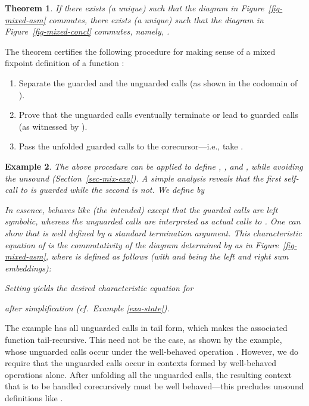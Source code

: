 \documentclass[preprint,draft]
{sigplanconf}
\newtheorem{theorem}{Theorem}
\newtheorem{eexample}[theorem]{Example}
\newcommand{\<}{\langle}
\renewcommand{\>}{\rangle}
\def\S{Section~}
\begin{document}
\begin{theorem}\rm \label{thm-mixed}
If there exists (a unique)  such that the diagram in Figure~\ref{fig-mixed-asm} commutes,
there exists (a unique)  such that the diagram in Figure~\ref{fig-mixed-concl} commutes, namely,
.
\end{theorem}

The theorem certifies the following procedure for making sense of a mixed fixpoint definition of a function :
\begin{enumerate}
\item Separate the guarded and the unguarded calls (as shown in the codomain  of ).
\item Prove that the unguarded calls eventually terminate or lead to guarded calls (as witnessed by ).
\item Pass the unfolded guarded calls to the corecursor---i.e., take .
\end{enumerate}


\begin{eexample}\rm \label{exa-mixed}
The above procedure can be applied to define ,
, and ,
while avoiding the unsound  (\S\ref{sec-mix-exa}).
A simple analysis reveals that
the first self-call to  is guarded while the second is not.
We define
 by
\begin{quote}

\end{quote}
In essence,  behaves like (the intended)  except that the guarded calls are left
symbolic, whereas the unguarded calls are interpreted as actual calls to .
One can show that  is well defined by a standard termination argument.
This characteristic equation of 
is the commutativity of the diagram
determined by  as in Figure~\ref{fig-mixed-asm},
where  is
defined as follows
(with  and  being the left and right sum embeddings):
\begin{quote}

\end{quote}
Setting  yields the desired characteristic equation for

after simplification (cf.\ Example \ref{exa-state}).
\end{eexample}

The  example has all unguarded calls in tail form, which makes the associated function 
tail-recursive. This need not be the case, as shown by the  example,
whose unguarded calls occur under
the well-behaved operation . However, we do require that the unguarded calls occur in contexts formed by
well-behaved operations alone. After unfolding all the unguarded calls,
the resulting context that is to be handled corecursively
must be well behaved---this precludes unsound definitions like
. 
\end{document}
